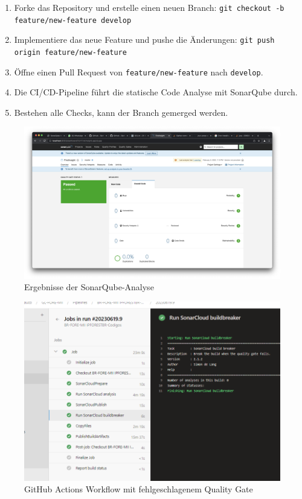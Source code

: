 \begin{enumerate}
    \item Forke das Repository und erstelle einen neuen Branch: \texttt{git checkout -b feature/new-feature develop}
    \item Implementiere das neue Feature und pushe die Änderungen: \texttt{git push origin feature/new-feature}
    \item Öffne einen Pull Request von \texttt{feature/new-feature} nach \texttt{develop}.
    \item Die CI/CD-Pipeline führt die statische Code Analyse mit SonarQube durch.
    \item Bestehen alle Checks, kann der Branch gemerged werden.
\end{enumerate}


\begin{figure}[h!]
\centering
\includegraphics[width=\textwidth]{img/sonarqube_results.jpeg}
\caption{Ergebnisse der SonarQube-Analyse}
\label{fig:sonarqube_results}
\end{figure}

\begin{figure}[h!]
\centering
\includegraphics[width=\textwidth]{img/github_actions_failed_quality_gate.png}
\caption{GitHub Actions Workflow mit fehlgeschlagenem Quality Gate}
\label{fig:github_actions_failed_quality_gate}
\end{figure}


